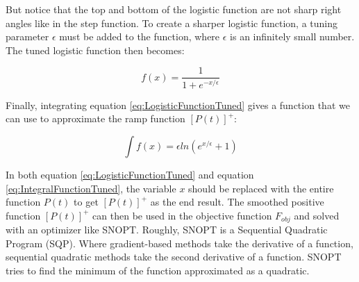 But notice that the top and bottom of the logistic function are not sharp right angles like in the step function. To create a sharper logistic function, a tuning parameter $\epsilon$ must be added to the function, where $\epsilon$ is an infinitely small number. The tuned logistic function then becomes:

\begin{equation}
f(x)= \frac{1}{1+e^{-x/\epsilon}}
\label{eq:LogisticFunctionTuned}
\end{equation}

Finally, integrating equation \ref{eq:LogisticFunctionTuned} gives a function that we can use to approximate the ramp function $[P(t)]^{+}$:

\begin{equation}
\int f(x) = \epsilon ln(e^{x/\epsilon}+1)
\label{eq:IntegralFunctionTuned}
\end{equation}

In both equation \ref{eq:LogisticFunctionTuned} and equation \ref{eq:IntegralFunctionTuned}, the variable $x$ should be replaced with the entire function $P(t)$ to get $[P(t)]^{+}$ as the end result. The smoothed positive function $[P(t)]^{+}$ can then be used in the objective function $F_{obj}$ and solved with an optimizer like SNOPT. Roughly, SNOPT is a Sequential Quadratic Program (SQP). Where gradient-based methods take the derivative of a function, sequential quadratic methods take the second derivative of a function. SNOPT tries to find the minimum of the function approximated as a quadratic. 
